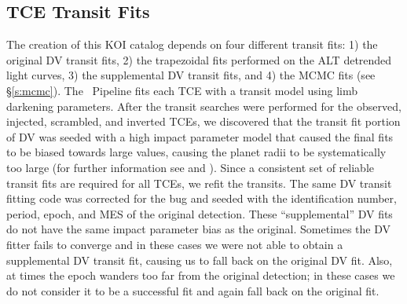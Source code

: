 \subsection{TCE Transit Fits}
\label{s:fits}
The creation of this KOI catalog depends on four different transit fits: 1) the original DV transit fits, 2) the trapezoidal fits performed on the ALT \citet{Garcia2010} detrended light curves, 3) the supplemental DV transit fits, and 4) the MCMC fits (see \S\ref{s:mcmc}).  The \Kepler\ Pipeline fits each TCE with a \citet{Mandel2002} transit model using \citet{Claret2000} limb darkening parameters. After the transit searches were performed for the observed, injected, scrambled, and inverted TCEs, we discovered that the transit fit portion of DV was seeded with a high impact parameter model that caused the final fits to be biased towards large values, causing the planet radii to be systematically too large (for further information see \citealt{Christiansen2017} and \citealt{Coughlin2017a}). Since a consistent set of reliable transit fits are required for all TCEs, we refit the transits.  The same DV transit fitting code was corrected for the bug and seeded with the \Kepler{} identification number, period, epoch, and MES of the original detection. These ``supplemental'' DV fits do not have the same impact parameter bias as the original.  Sometimes the DV fitter fails to converge and in these cases we were not able to obtain a supplemental DV transit fit, causing us to fall back on the original DV fit. Also, at times the epoch wanders too far from the original detection; in these cases we do not consider it to be a successful fit and again fall back on the original fit.

